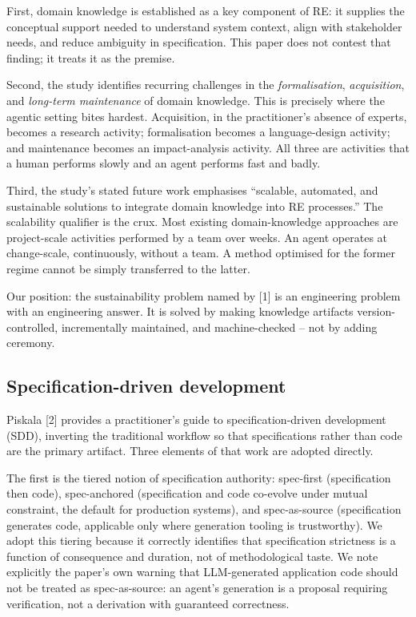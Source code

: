 \documentclass[11pt,a4paper]{article}
\begin{document}
First, domain knowledge is established as a key component of RE: it supplies the conceptual support needed to understand system context, align with stakeholder needs, and reduce ambiguity in specification. This paper does not contest that finding; it treats it as the premise.

Second, the study identifies recurring challenges in the \emph{formalisation}, \emph{acquisition}, and \emph{long-term maintenance} of domain knowledge. This is precisely where the agentic setting bites hardest. Acquisition, in the practitioner's absence of experts, becomes a research activity; formalisation becomes a language-design activity; and maintenance becomes an impact-analysis activity. All three are activities that a human performs slowly and an agent performs fast and badly.

Third, the study's stated future work emphasises ``scalable, automated, and sustainable solutions to integrate domain knowledge into RE processes.'' The scalability qualifier is the crux. Most existing domain-knowledge approaches are project-scale activities performed by a team over weeks. An agent operates at change-scale, continuously, without a team. A method optimised for the former regime cannot be simply transferred to the latter.

Our position: the sustainability problem named by [1] is an engineering problem with an engineering answer. It is solved by making knowledge artifacts version-controlled, incrementally maintained, and machine-checked -- not by adding ceremony.

\subsection{Specification-driven development}

Piskala [2] provides a practitioner's guide to specification-driven development (SDD), inverting the traditional workflow so that specifications rather than code are the primary artifact. Three elements of that work are adopted directly.

The first is the tiered notion of specification authority: spec-first (specification then code), spec-anchored (specification and code co-evolve under mutual constraint, the default for production systems), and spec-as-source (specification generates code, applicable only where generation tooling is trustworthy). We adopt this tiering because it correctly identifies that specification strictness is a function of consequence and duration, not of methodological taste. We note explicitly the paper's own warning that LLM-generated application code should not be treated as spec-as-source: an agent's generation is a proposal requiring verification, not a derivation with guaranteed correctness.
\end{document}
